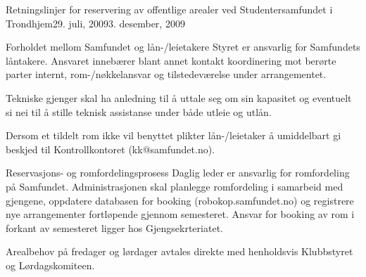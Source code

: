 \begin{instruks}{Retningslinjer for reservering av offentlige arealer
    ved Studentersamfundet i Trondhjem}{29. juli, 2009}{3. desember, 2009}
\begin{instruksledd}{Forholdet mellom Samfundet og lån-/leietakere}
        Styret er ansvarlig for Samfundets låntakere. Ansvaret innebærer blant annet
        kontakt koordinering mot berørte parter
        internt, rom-/nøkkelansvar og tilstedeværelse under arrangementet.

        Tekniske gjenger skal ha anledning til å uttale seg om sin kapasitet og
        eventuelt si nei til å stille teknisk assistanse
        under både utleie og utlån.

        Dersom et tildelt rom ikke vil benyttet plikter lån-/leietaker å umiddelbart
        gi beskjed til Kontrollkontoret (kk@samfundet.no).
    \end{instruksledd}

    \begin{instruksledd}{Reservasjons- og romfordelingsprosess}
        Daglig leder er ansvarlig for romfordeling på Samfundet. Administrasjonen skal
        planlegge romfordeling i samarbeid
        med gjengene, oppdatere databasen for booking (robokop.samfundet.no) og
        registrere nye arrangementer fortløpende
        gjennom semesteret. Ansvar for booking av rom i forkant av semesteret ligger
        hos Gjengsekrteriatet.


        Arealbehov på fredager og lørdager avtales direkte med henholdsvis Klubbstyret
        og Lørdagskomiteen.


\end{instruksledd}
\end{instruks}
